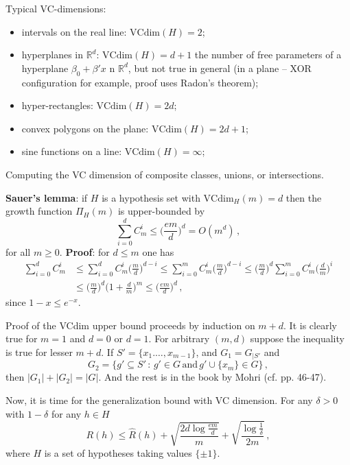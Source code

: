 \documentclass[a4paper]{article}
\newcommand{\Real}{\mathbb{R}}
\begin{document}
Typical VC-dimensions: \begin{itemize}
    \item intervals on the real line: $\text{VCdim}(H) = 2$;
    \item hyperplanes in $\Real^d$: $\text{VCdim}(H) = d+1$ the number of free parameters
    of a hyperplane $\beta_0 + \beta'x$ n $\Real^d$, but not true in general (in
    a plane -- XOR configuration for example, proof uses Radon's theorem);
    \item hyper-rectangles: $\text{VCdim}(H) = 2d$;
    \item convex polygons on the plane: $\text{VCdim}(H) = 2d + 1$;
    \item sine functions on a line: $\text{VCdim}(H) = \infty$;
\end{itemize}

Computing the VC dimension of composite classes, unions, or intersections.

\textbf{Sauer's lemma}: if $H$ is a hypothesis set with $\text{VCdim}_H(m) = d$
then the growth function $\Pi_H(m)$ is upper-bounded by
\[ \sum_{i=0}^d C^i_m \leq \biggl(\frac{em}{d}\biggr)^d  = O(m^d) \,, \]
for all $m\geq 0$.
\textbf{Proof}: for $d\leq m$ one has \begin{align}
    \sum_{i=0}^d C^i_m
        &\leq \sum_{i=0}^d C^i_m \biggl(\frac{m}{d}\biggr)^{d-i} 
         \leq \sum_{i=0}^m C^i_m \biggl(\frac{m}{d}\biggr)^{d-i}
         \leq \biggl(\frac{m}{d}\biggr)^d \sum_{i=0}^m C^i_m \biggl(\frac{d}{m}\biggr)^i \\
        &\leq \biggl(\frac{m}{d}\biggr)^d \biggl(1+\frac{d}{m}\biggr)^m
         \leq \biggl(\frac{em}{d}\biggr)^d \,,
\end{align}
since $1 - x \leq e^{-x}$.

Proof of the VCdim upper bound proceeds by induction on $m+d$. It is clearly true
for $m=1$ and $d=0$ or $d=1$. For arbitrary $(m, d)$ suppose the inequality is true
for lesser $m+d$. If $S'= \{x_1. \ldots, x_{m-1}\}$, and $G_1 = G_{|S'}$ and
\[ G_2 = \{g'\subseteq S'\,:\, g'\in G\,\text{and}\, g'\cup\{x_m\} \in G \}\,, \]
then $|G_1| + |G_2| = |G|$. And the rest is in the book by Mohri (cf. pp. 46-47).

Now, it is time for the generalization bound with VC dimension. For any $\delta>0$
with $1-\delta$ for any $h\in H$
\[ R(h)
    \leq \hat{R}(h) + \sqrt{\frac{2d\log \frac{em}{d}}{m}}
                    + \sqrt{\frac{\log\frac{1}{\delta}}{2m}}
\,,\]
where $H$ is a set of hypotheses taking values $\{\pm 1\}$.
\end{document}

